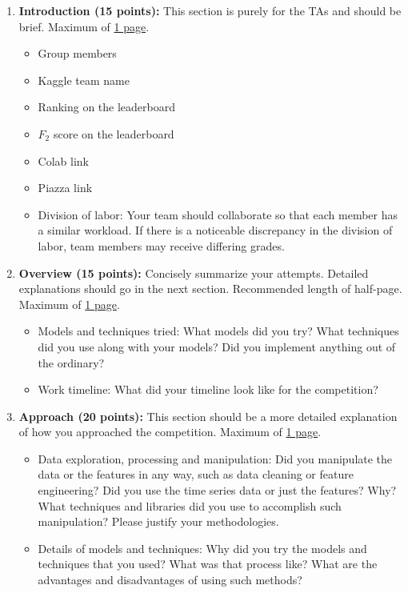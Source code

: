 \begin{enumerate}
    \item \textbf{Introduction (15 points):} This section is purely for the TAs and should be brief. Maximum of \underline{1 page}.
    \begin{itemize}
        \item Group members
        \item Kaggle team name
        \item Ranking on the leaderboard
        \item $F_2$ score on the leaderboard
        \item Colab link
        \item Piazza link
        \item Division of labor: Your team should collaborate so that each member has a similar workload. If there is a noticeable discrepancy in the division of labor, team members may receive differing grades.
    \end{itemize}

    \item \textbf{Overview (15 points):} Concisely summarize your attempts. Detailed explanations should go in the next section. Recommended length of half-page. Maximum of \underline{1 page}.
    \begin{itemize}
        \item Models and techniques tried: What models did you try? What techniques did you use along with your models? Did you implement anything out of the ordinary?

        \item Work timeline: What did your timeline look like for the competition?
    \end{itemize}

    \item \textbf{Approach (20 points):} This section should be a more detailed explanation of how you approached the competition. Maximum of \underline{1 page}.
    \begin{itemize}
        \item Data exploration, processing and manipulation: Did you manipulate the data or the features in any way, such as data cleaning or feature engineering? Did you use the time series data or just the features? Why? What techniques and libraries did you use to accomplish such manipulation? Please justify your methodologies.

        \item Details of models and techniques: Why did you try the models and techniques that you used? What was that process like? What are the advantages and disadvantages of using such methods?
        

\end{itemize}
\end{enumerate}
